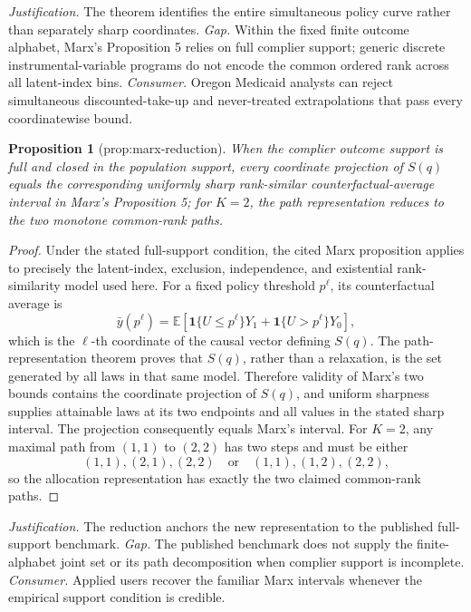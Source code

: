 \documentclass{article}
\newtheorem{proposition}{Proposition}
\begin{document}
\par\smallskip\noindent \textit{Justification.} The theorem identifies the entire simultaneous policy curve rather than separately sharp coordinates. \textit{Gap.} Within the fixed finite outcome alphabet, Marx's Proposition 5 relies on full complier support; generic discrete instrumental-variable programs do not encode the common ordered rank across all latent-index bins. \textit{Consumer.} Oregon Medicaid analysts can reject simultaneous discounted-take-up and never-treated extrapolations that pass every coordinatewise bound.

\begin{proposition}[prop:marx-reduction]\label{prop:marx-reduction}
When the complier outcome support is full and closed in the population support, every coordinate projection of \(S(q)\) equals the corresponding uniformly sharp rank-similar counterfactual-average interval in Marx's Proposition 5; for \(K=2\), the path representation reduces to the two monotone common-rank paths.
\end{proposition}
\begin{proof}
Under the stated full-support condition, the cited Marx proposition applies to precisely the latent-index, exclusion, independence, and existential rank-similarity model used here.  For a fixed policy threshold \(p^\ell\), its counterfactual average is
\[
\bar y(p^\ell)=\mathbb E[\mathbf 1\{U\le p^\ell\}Y_1+\mathbf 1\{U>p^\ell\}Y_0],
\]
which is the \(\ell\)-th coordinate of the causal vector defining \(S(q)\).  The path-representation theorem proves that \(S(q)\), rather than a relaxation, is the set generated by all laws in that same model.  Therefore validity of Marx's two bounds contains the coordinate projection of \(S(q)\), and uniform sharpness supplies attainable laws at its two endpoints and all values in the stated sharp interval.  The projection consequently equals Marx's interval.  For \(K=2\), any maximal path from \((1,1)\) to \((2,2)\) has two steps and must be either
\[
(1,1),(2,1),(2,2)
\quad\text{or}\quad
(1,1),(1,2),(2,2),
\]
so the allocation representation has exactly the two claimed common-rank paths.
\end{proof}
\par\smallskip\noindent \textit{Justification.} The reduction anchors the new representation to the published full-support benchmark. \textit{Gap.} The published benchmark does not supply the finite-alphabet joint set or its path decomposition when complier support is incomplete. \textit{Consumer.} Applied users recover the familiar Marx intervals whenever the empirical support condition is credible.
\end{document}
